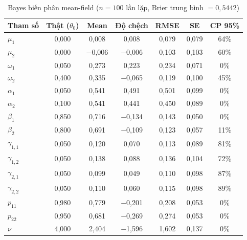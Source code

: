 \documentclass[11pt,a4paper]{article}
\begin{document}
\begin{table}[H]\centering\scriptsize
\caption{Bayes biến phân mean-field ($n=100$ lần lặp, Brier trung bình $=0,5442$)}
\begin{tabularx}{\textwidth}{l C C C C C C}
\toprule
\textbf{Tham số} & \textbf{Thật ($\theta_0$)} & \textbf{Mean} & \textbf{Độ chệch} & \textbf{RMSE} & \textbf{SE} & \textbf{CP 95\%} \\
\midrule
$\mu_1$ & 0,000 & 0,008 & 0,008 & 0,079 & 0,079 & 64\% \\
$\mu_2$ & 0,000 & $-$0,006 & $-$0,006 & 0,103 & 0,103 & 60\% \\
$\omega_1$ & 0,050 & 0,273 & 0,223 & 0,234 & 0,071 & 0\% \\
$\omega_2$ & 0,400 & 0,335 & $-$0,065 & 0,119 & 0,100 & 45\% \\
$\alpha_1$ & 0,050 & 0,541 & 0,491 & 0,501 & 0,099 & 0\% \\
$\alpha_2$ & 0,100 & 0,541 & 0,441 & 0,450 & 0,089 & 0\% \\
$\beta_1$ & 0,850 & 0,716 & $-$0,134 & 0,143 & 0,050 & 0\% \\
$\beta_2$ & 0,800 & 0,691 & $-$0,109 & 0,123 & 0,057 & 11\% \\
$\gamma_{1,1}$ & 0,050 & 0,120 & 0,070 & 0,113 & 0,089 & 81\% \\
$\gamma_{1,2}$ & 0,050 & 0,138 & 0,088 & 0,136 & 0,104 & 72\% \\
$\gamma_{2,1}$ & 0,050 & 0,099 & 0,049 & 0,110 & 0,098 & 87\% \\
$\gamma_{2,2}$ & 0,050 & 0,110 & 0,060 & 0,115 & 0,098 & 89\% \\
$p_{11}$ & 0,980 & 0,779 & $-$0,201 & 0,208 & 0,053 & 0\% \\
$p_{22}$ & 0,950 & 0,681 & $-$0,269 & 0,274 & 0,053 & 0\% \\
$\nu$ & 4,000 & 2,404 & $-$1,596 & 1,602 & 0,137 & 0\% \\
\bottomrule
\end{tabularx}
\end{table}
\end{document}
